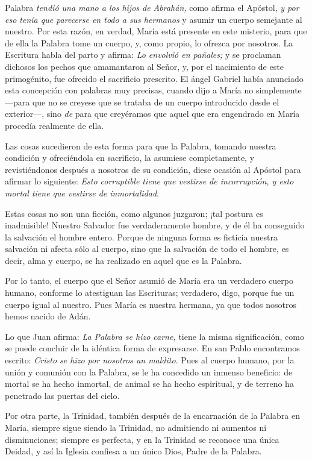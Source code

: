 \begin{body}
	 Palabra \emph{tendió una mano a los hijos de Abrahán,} como afirma el Apóstol, \emph{y por eso tenía que parecerse en todo a sus hermanos} y asumir un cuerpo semejante al nuestro. Por esta razón, en verdad, María está presente en este misterio, para que de ella la Palabra tome un cuerpo, y, como propio, lo ofrezca por nosotros. La Escritura habla del parto y afirma: \emph{Lo envolvió en pañales;} y se proclaman dichosos los pechos que amamantaron al Señor, y, por el nacimiento de este primogénito, fue ofrecido el sacrificio prescrito. El ángel Gabriel había anunciado esta concepción con palabras muy precisas, cuando dijo a María no simplemente  ---para que no se creyese que se trataba de un cuerpo introducido desde el exterior---, sino \emph{de} para que creyéramos que aquel que era engendrado en María procedía realmente de ella.
	
	Las cosas sucedieron de esta forma para que la Palabra, tomando nuestra condición y ofreciéndola en sacrificio, la asumiese completamente, y revistiéndonos después a nosotros de su condición, diese ocasión al Apóstol para afirmar lo siguiente: \emph{Esto corruptible tiene que vestirse de incorrupción, y esto mortal tiene que vestirse de inmortalidad}.
	
	Estas cosas no son una ficción, como algunos juzgaron; ¡tal postura es inadmisible! Nuestro Salvador fue verdaderamente hombre, y de él ha conseguido la salvación el hombre entero. Porque de ninguna forma es ficticia nuestra salvación ni afecta sólo al cuerpo, sino que la salvación de todo el hombre, es decir, alma y cuerpo, se ha realizado en aquel que es la Palabra.
	
	Por lo tanto, el cuerpo que el Señor asumió de María era un verdadero cuerpo humano, conforme lo atestiguan las Escrituras; verdadero, digo, porque fue un cuerpo igual al nuestro. Pues María es nuestra hermana, ya que todos nosotros hemos nacido de Adán.
	
	Lo que Juan afirma: \emph{La Palabra se hizo carne,} tiene la misma significación, como se puede concluir de la idéntica forma de expresarse. En san Pablo encontramos escrito: \emph{Cristo se hizo por nosotros un maldito}. Pues al cuerpo humano, por la unión y comunión con la Palabra, se le ha concedido un inmenso beneficio: de mortal se ha hecho inmortal, de animal se ha hecho espiritual, y de terreno ha penetrado las puertas del cielo.
	
	Por otra parte, la Trinidad, también después de la encarnación de la Palabra en María, siempre sigue siendo la Trinidad, no admitiendo ni aumentos ni disminuciones; siempre es perfecta, y en la Trinidad se reconoce una única Deidad, y así la Iglesia confiesa a un único Dios, Padre de la Palabra.
\end{body}


